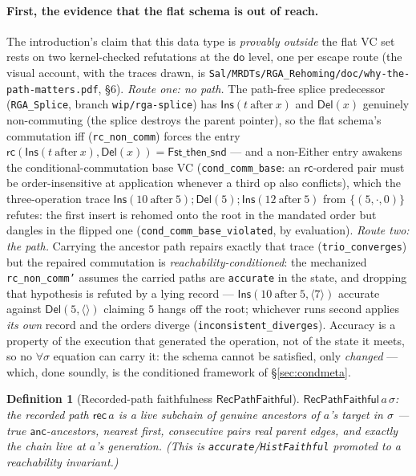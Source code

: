\documentclass[11pt]{article}
\newtheorem{definition}[theorem]{Definition}
\newcommand{\lean}[1]{\texttt{#1}}
\newcommand{\st}{\sigma}
\newcommand{\dodo}{\mathsf{do}}
\newcommand{\anc}{\mathsf{anc}}
\newcommand{\recList}{\mathsf{rec}}
\newcommand{\RVF}{\textsf{RecPathFaithful}}
\begin{document}
\paragraph{First, the evidence that the flat schema is out of reach.} The
introduction's claim that this data type is \emph{provably outside} the flat
VC set rests on two kernel-checked refutations at the $\dodo$ level, one per
escape route (the visual account, with the traces drawn, is
\lean{Sal/MRDTs/RGA\_Rehoming/doc/why-the-path-matters.pdf}, \S6).
\emph{Route one: no path.} The path-free splice predecessor
(\lean{RGA\_Splice}, branch \lean{wip/rga-splice}) has
$\mathsf{Ins}(t\ \text{after}\ x)$ and $\mathsf{Del}(x)$ genuinely
non-commuting (the splice destroys the parent pointer), so the flat schema's
commutation iff (\lean{rc\_non\_comm}) forces the entry
$\mathsf{rc}(\mathsf{Ins}(t\ \text{after}\ x), \mathsf{Del}(x)) =
\mathsf{Fst\_then\_snd}$ --- and a non-Either entry awakens the
conditional-commutation base VC (\lean{cond\_comm\_base}: an
$\mathsf{rc}$-ordered pair must be order-insensitive at application whenever
a third op also conflicts), which the three-operation trace
$\mathsf{Ins}(10\ \text{after}\ 5);\mathsf{Del}(5);
\mathsf{Ins}(12\ \text{after}\ 5)$ from $\{(5,\cdot,0)\}$ refutes: the first
insert is rehomed onto the root in the mandated order but dangles in the
flipped one (\lean{cond\_comm\_base\_violated}, by evaluation).
\emph{Route two: the path.} Carrying the ancestor path repairs exactly that
trace (\lean{trio\_converges}) but the repaired commutation is
\emph{reachability-conditioned}: the mechanized \lean{rc\_non\_comm'}
assumes the carried paths are \lean{accurate} in the state, and dropping
that hypothesis is refuted by a lying record ---
$\mathsf{Ins}(10\ \text{after}\ 5, \langle 7\rangle)$ accurate against
$\mathsf{Del}(5, \langle\rangle)$ claiming $5$ hangs off the root; whichever
runs second applies \emph{its own} record and the orders diverge
(\lean{inconsistent\_diverges}). Accuracy is a property of the execution
that generated the operation, not of the state it meets, so no
$\forall\sigma$ equation can carry it: the schema cannot be satisfied, only
\emph{changed} --- which, done soundly, is the conditioned framework of
\S\ref{sec:condmeta}.

\begin{definition}[Recorded-path faithfulness $\RVF$]\label{def:rvf}
$\RVF\,a\,\st$: the recorded path $\recList\,a$ is a \emph{live subchain of genuine
ancestors} of $a$'s target in $\st$ --- true $\anc$-ancestors, nearest first, consecutive
pairs real parent edges, and exactly the chain live at $a$'s generation. (This is
\lean{accurate}/\lean{HistFaithful} promoted to a reachability invariant.)
\end{definition}
\end{document}
